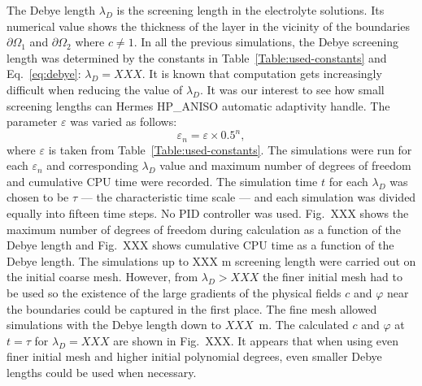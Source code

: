The Debye length $\lambda_D$ is the screening length in the electrolyte
solutions. Its numerical value shows the
thickness of the layer in the vicinity of the boundaries $\partial\Omega_1$ 
and $\partial\Omega_2$  where $c \neq 1$.
In all the previous simulations, the Debye screening length was determined by  the constants in
Table~\ref{Table:used-constants} and Eq.~\ref{eq:debye}: $\lambda_D=XXX$. It is known that computation gets increasingly
difficult when reducing the value of $\lambda_D$.
It was our interest to see how small screening lengths can Hermes HP\_ANISO automatic
adaptivity handle. The parameter $\varepsilon$ was varied as follows:
$$\varepsilon_n=\varepsilon\times 0.5^n,$$ where $\varepsilon$ is taken from Table~\ref{Table:used-constants}. The simulations were run for each $\varepsilon_n$ and corresponding $\lambda_D$ value
and maximum number of degrees of freedom and cumulative CPU time were recorded.
The simulation time $t$ for each $\lambda_D$ was chosen to be $\tau$ --- the
characteristic time scale --- and each simulation
was divided equally into fifteen time steps. No PID controller was used.
Fig.~XXX shows the maximum number of degrees of freedom during calculation
as a function of the Debye length and Fig.~XXX shows cumulative CPU time as a function
of the Debye length. The simulations up to XXX m screening length were carried out on
the initial coarse mesh. However, from $\lambda_D > XXX$ the finer initial mesh had to
be used so the existence of the large gradients of the
physical fields $c$ and $\varphi$ near the boundaries could be captured in the first place.
The fine mesh allowed simulations with the Debye length down to $XXX$~m. The calculated
$c$ and $\varphi$ at $t=\tau$ for $\lambda_D=XXX$ are shown in Fig.~XXX.
It appears that when using even finer initial mesh and higher initial polynomial degrees, even
smaller Debye lengths could be used when necessary.